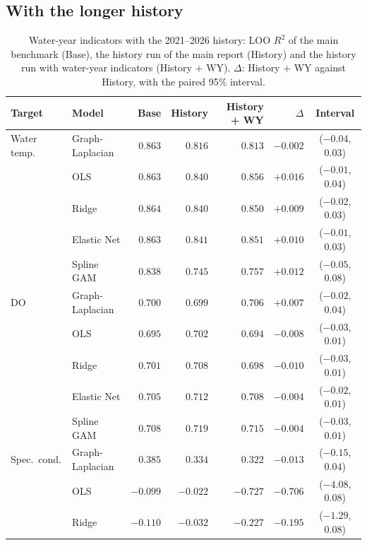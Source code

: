 \documentclass[11pt]{article}
\begin{document}
\subsection{With the longer history}

\begin{table}[h]
\centering
\small
\caption{Water-year indicators with the 2021--2026 history: LOO $R^2$ of the main benchmark (Base),
the history run of the main report (History) and the history run with water-year indicators
(History + WY). $\Delta$: History + WY against History, with the paired 95\% interval.}
\label{tab:histwy}
\begin{tabular}{ll rrr rc}
\toprule
Target & Model & Base & History & History + WY & $\Delta$ & Interval \\
\midrule
Water temp.   & Graph-Laplacian & $0.863$ & $0.816$ & $0.813$ & $-0.002$ & ($-0.04$, $0.03$) \\
              & OLS             & $0.863$ & $0.840$ & $0.856$ & $+0.016$ & ($-0.01$, $0.04$) \\
              & Ridge           & $0.864$ & $0.840$ & $0.850$ & $+0.009$ & ($-0.02$, $0.03$) \\
              & Elastic Net     & $0.863$ & $0.841$ & $0.851$ & $+0.010$ & ($-0.01$, $0.03$) \\
              & Spline GAM      & $0.838$ & $0.745$ & $0.757$ & $+0.012$ & ($-0.05$, $0.08$) \\
\addlinespace
DO            & Graph-Laplacian & $0.700$ & $0.699$ & $0.706$ & $+0.007$ & ($-0.02$, $0.04$) \\
              & OLS             & $0.695$ & $0.702$ & $0.694$ & $-0.008$ & ($-0.03$, $0.01$) \\
              & Ridge           & $0.701$ & $0.708$ & $0.698$ & $-0.010$ & ($-0.03$, $0.01$) \\
              & Elastic Net     & $0.705$ & $0.712$ & $0.708$ & $-0.004$ & ($-0.02$, $0.01$) \\
              & Spline GAM      & $0.708$ & $0.719$ & $0.715$ & $-0.004$ & ($-0.03$, $0.01$) \\
\addlinespace
Spec.\ cond.  & Graph-Laplacian & $0.385$ & $0.334$ & $0.322$ & $-0.013$ & ($-0.15$, $0.04$) \\
              & OLS             & $-0.099$ & $-0.022$ & $-0.727$ & $-0.706$ & ($-4.08$, $0.08$) \\
              & Ridge           & $-0.110$ & $-0.032$ & $-0.227$ & $-0.195$ & ($-1.29$, $0.08$) \\

\end{tabular}
\end{table}
\end{document}
